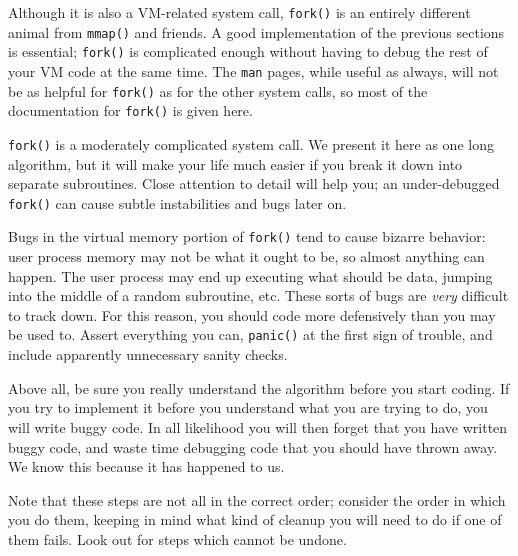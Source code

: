 Although it is also a VM-related system call, \texttt{fork()} is an entirely different animal from \texttt{mmap()} and friends. A good implementation of the previous sections is essential; \texttt{fork()} is complicated enough without having to debug the rest of your VM code at the same time. The \texttt{man} pages, while useful as always, will not be as helpful for \texttt{fork()} as for the other system calls, so most of the documentation for \texttt{fork()} is given here.

\texttt{fork()} is a moderately complicated system call. We present it here as one long algorithm, but it will make your life much easier if you break it down into separate subroutines. Close attention to detail will help you; an under-debugged \texttt{fork()} can cause subtle instabilities and bugs later on.

Bugs in the virtual memory portion of \texttt{fork()} tend to cause bizarre behavior: user process memory may not be what it ought to be, so almost anything can happen. The user process may end up executing what should be data, jumping into the middle of a random subroutine, etc. These sorts of bugs are \emph{very} difficult to track down. For this reason, you should code more defensively than you may be used to. Assert everything you can, \texttt{panic()} at the first sign of trouble, and include apparently unnecessary sanity checks.

Above all, be sure you really understand the algorithm before you start coding. If you try to implement it before you understand what you are trying to do, you will write buggy code. In all likelihood you will then forget that you have written buggy code, and waste time debugging code that you should have thrown away. We know this because it has happened to us.

Note that these steps are not all in the correct order; consider the order in which you do them, keeping in mind what kind of cleanup you will need to do if one of them fails. Look out for steps which cannot be undone.

